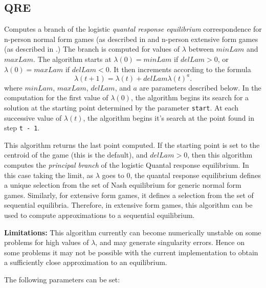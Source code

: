 \subsection{QRE}\label{QRE}
Computes a branch of the logistic {\em quantal response equilibrium} 
correspondence for n-person normal form games (as described 
in \cite{McKPal:95a}  and n-person extensive form games (as described 
in \cite{McKPal:95b}.) The branch is computed 
for values of $\lambda$ between $minLam$ and $maxLam$.  The algorithm 
starts at $\lambda(0) = minLam$ if $delLam > 0$, or 
$\lambda(0) = maxLam$ if 
$delLam < 0$. It then increments according to the formula 
$$
\lambda(t+1) = \lambda(t) +delLam \lambda(t)^a.
$$
where $minLam$, $maxLam$, $delLam$, and $a$ are
parameters described below. In the computation for the first value of
$\lambda(0)$, the algorithm begins its search for a solution at the
starting point determined by the parameter \verb+start+.  At each
successive value of $\lambda(t)$, the algorithm begins it's search at
the point found in step \verb+t - 1+.  

This algorithm returns the last point computed.  If the starting point
is set to the centroid of the game (this is the default), and $delLam 
> 0$, then this algorithm computes the {\em principal branch} of the
logistic Quantal response equilibrium.  In this case taking the limit,
as $\lambda$ goes to 0, the quantal response equilibrium defines a
unique selection from the set of Nash equilibrium for generic normal
form games.  Similarly, for extensive form games, it defines a
selection from the set of sequential equilibria.  Therefore, in
extensive form games, this algorithm can be used to compute
approximations to a sequential equilibrium.

{\bf Limitations:} This algorithm currently can become numerically
unstable on some problems for high values of $\lambda$, and may
generate singularity errors.  Hence on some problems it may not be
possible with the current implementation to obtain a sufficiently
close approximation to an equilibrium.

The following parameters can be set:

